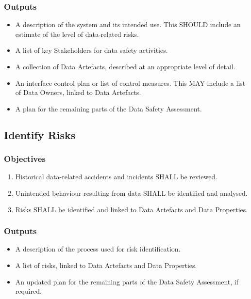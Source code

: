 \subsubsection{Outputs}
\begin{itemize}
	\item A description of the system and its intended use. This SHOULD include an estimate of the level of data-related risks.
	\item A list of key Stakeholders for data safety activities.
	\item A collection of \glspl{Data Artefact}, described at an appropriate level of detail.
	\item An interface control plan or list of control measures. This MAY include a list of \glspl{Data Owner}, linked to \glspl{Data Artefact}.
	\item A plan for the remaining parts of the Data Safety Assessment.
\end{itemize}

\subsection{Identify Risks}
\subsubsection{Objectives}
\begin{enumerate}[label=\color{dsiwgAccentColour}{2-\arabic*}]
	\item Historical data-related accidents and incidents SHALL be reviewed.
	\item Unintended behaviour resulting from data SHALL be identified and analysed.
	\item Risks SHALL be identified and linked to \glspl{Data Artefact} and Data Properties.
\end{enumerate}

\subsubsection{Outputs}
\begin{itemize}
	\item A description of the process used for risk identification.
	\item A list of risks, linked to \glspl{Data Artefact} and Data Properties.
	\item An updated plan for the remaining parts of the Data Safety Assessment, if required.
\end{itemize}


